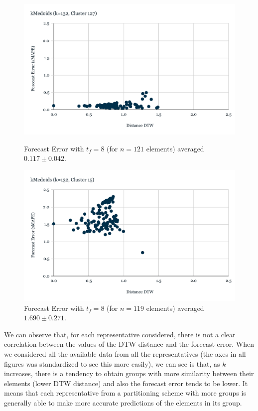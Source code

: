 \begin{figure}[!htbp]
  \centering
  \begin{minipage}[b]{0.45\textwidth}
    \includegraphics[width=\textwidth]{../Figures/distDTW_ForecastError_k132_c127}
    \caption{Forecast Error with $t_{f}=8$ (for $n=121$ elements) averaged $0.117 \pm 0.042$.}
    \label{Fig:DTWsMAPE_k132_c127}
  \end{minipage}
  \hfill
  \begin{minipage}[b]{0.45\textwidth}
    \includegraphics[width=\textwidth]{../Figures/distDTW_ForecastError_k132_c15}
    \caption{Forecast Error with $t_{f}=8$ (for $n=119$ elements) averaged $1.690 \pm 0.271$.}
    \label{Fig:DTWsMAPE_k132_c15}
  \end{minipage}
\end{figure}

We can observe that, for each representative considered, there is not a clear correlation between the values of the DTW distance and the forecast error. When we considered all the available data from all the representatives (the axes in all figures was standardized to see this more easily), we can see is that, as $k$ increases, there is a tendency to obtain groups with more similarity between their elements (lower DTW distance) and also the forecast error tends to be lower. It means that each representative from a partitioning scheme with more groups is generally able to make more accurate predictions of the elements in its group.

